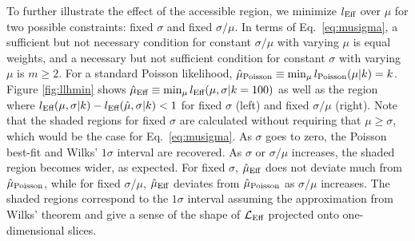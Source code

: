 To further illustrate the effect of the accessible region, we minimize $l_\textmd{Eff}$ over $\mu$ for two possible constraints: fixed $\sigma$ and fixed $\sigma/\mu$.
In terms of Eq.~\eqref{eq:musigma}, a sufficient but not necessary condition for constant $\sigma/\mu$ with varying $\mu$ is equal weights, and a necessary but not sufficient condition for constant $\sigma$ with varying $\mu$ is $m \geq 2$.
For a standard Poisson likelihood, $\hat{\mu}_\textmd{Poisson}\equiv \min_\mu l_{\textmd{Poisson}}(\mu|k) = k$.
Figure \ref{fig:llhmin} shows $\hat{\mu}_\textmd{Eff} \equiv \min_\mu l_\textmd{Eff}(\mu,\sigma|k=100)$ as well as the region where $l_\textmd{Eff}(\mu, \sigma|k) - l_\textmd{Eff}(\hat{\mu}, \sigma|k) < 1$ for fixed $\sigma$ (left) and fixed $\sigma/\mu$ (right).
Note that the shaded regions for fixed $\sigma$ are calculated without requiring that $\mu \geq \sigma$, which would be the case for Eq.~\eqref{eq:musigma}.
As $\sigma$ goes to zero, the Poisson best-fit and Wilks' $1\sigma$ interval are recovered.
As $\sigma$ or $\sigma/\mu$ increases, the shaded region becomes wider, as expected.
For fixed $\sigma$, $\hat{\mu}_\textmd{Eff}$ does not deviate much from $\hat{\mu}_\textmd{Poisson}$, while for fixed $\sigma/\mu$, $\hat{\mu}_\textmd{Eff}$ deviates from $\hat{\mu}_\textmd{Poisson}$ as $\sigma/\mu$ increases.
The shaded regions correspond to the $1\sigma$ interval assuming the approximation from Wilks' theorem and give a sense of the shape of $\mathcal{L}_\textmd{Eff}$ projected onto one-dimensional slices.
